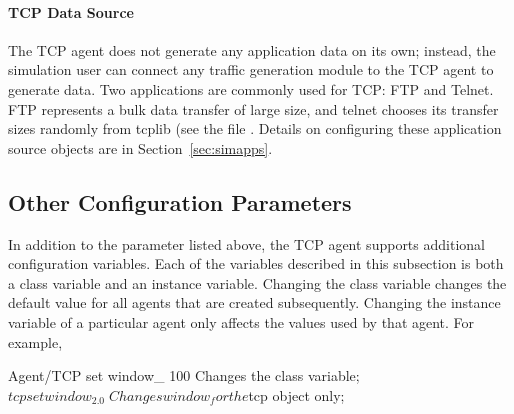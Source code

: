 \paragraph{TCP Data Source}
The TCP agent does not generate any application data on its own;
instead, the simulation user can connect any traffic generation
module to the TCP agent to generate data.
Two applications are commonly used for TCP: FTP and Telnet.
FTP represents a bulk data transfer of large size, and telnet chooses
its transfer sizes randomly from tcplib (see the file
.
Details on configuring these application source objects are in
Section~\ref{sec:simapps}.

\subsection{Other Configuration Parameters}
\label{sec:other-tcp-config}

In addition to the  parameter listed above,
the TCP agent supports additional configuration variables.
Each of the variables described in this subsection is
both a class variable and an instance variable.
Changing the class variable changes the default value
for all agents that are created subsequently.
Changing the instance variable of a particular agent
only affects the values used by that agent.
For example,
\begin{program}
  Agent/TCP set window_ 100     \; Changes the class variable;
  $tcp set window_ 2.0          \; Changes window_ for the $tcp object only;
\end{program}

